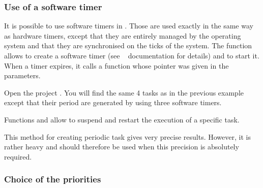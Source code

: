 
    \subsubsection{Use of a software timer}

        It is possible to use software timers in \rtos. Those are used exactly in the same way as hardware timers, except that they are entirely managed by the operating system and that they are synchronised on the ticks of the system. The function  allows to create a software timer (see \rtos~ documentation for details) and  to start it. When a timer expires, it calls a function whose pointer was given in the parameters.

        Open the project .
        You will find the same 4 tasks as in the previous example except that their period are generated by using three software timers.

        Functions  and  allow to suspend and restart the execution of a specific task.


        This method for creating periodic task gives very precise results. However, it is rather heavy and should therefore be used when this precision is absolutely required.


    \subsubsection{Choice of the priorities}

